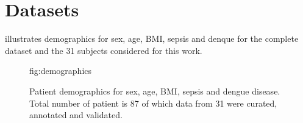 \documentclass[mlabstract,twocolumn]{jmlr}
\begin{document}

\newpage

\newpage
\appendix

\section{Datasets}\label{apd:datasets}
 illustrates demographics for sex, age, BMI, sepsis and denque for the complete dataset and the 31 subjects considered for this work.
\begin{figure}[htbp]
\floatconts
  {fig:demographics}
  {\caption{Patient demographics for sex, age, BMI, sepsis and dengue disease. Total number of patient is 87 of which data from 31 were curated, annotated and validated.}} %

\end{figure}
\end{document}

